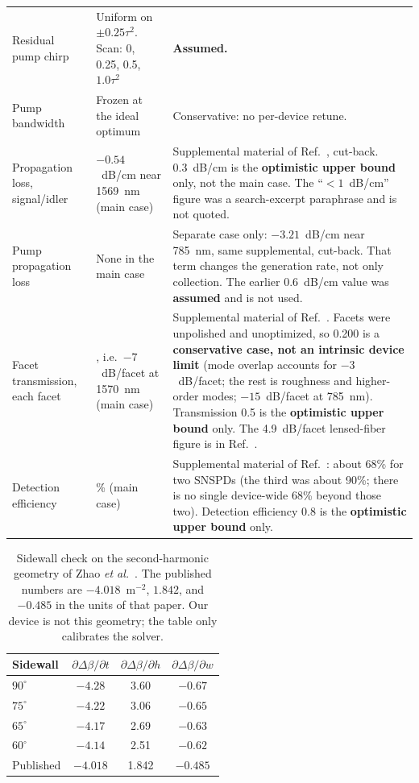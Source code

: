 \documentclass[11pt,a4paper]{article}
\begin{document}
{\begin{longtable}{@{}>{\raggedright\arraybackslash}p{2.35cm}>{\raggedright\arraybackslash}p{6.15cm}>{\raggedright\arraybackslash}p{6.55cm}@{}}
Residual pump chirp & Uniform on $\pm 0.25\tau^{2}$. Scan: 0, 0.25, 0.5, $1.0\tau^{2}$ & \textbf{Assumed.} \\
Pump bandwidth & Frozen at the ideal optimum & Conservative: no per-device retune. \\
Propagation loss, signal/idler & $-0.54$~dB/cm near 1569~nm (main case) & Supplemental material of Ref.~\cite{Zhao2020}, cut-back. 0.3~dB/cm is the \textbf{optimistic upper bound} only, not the main case. The ``$<1$~dB/cm'' figure was a search-excerpt paraphrase and is not quoted. \\
Pump propagation loss & None in the main case & Separate case only: $-3.21$~dB/cm near 785~nm, same supplemental, cut-back. That term changes the generation rate, not only collection. The earlier 0.6~dB/cm value was \textbf{assumed} and is not used. \\
Facet transmission, each facet & 0.200, i.e.\ $-7$~dB/facet at 1570~nm (main case) & Supplemental material of Ref.~\cite{Zhao2020}. Facets were unpolished and unoptimized, so 0.200 is a \textbf{conservative case, not an intrinsic device limit} (mode overlap accounts for $-3$~dB/facet; the rest is roughness and higher-order modes; $-15$~dB/facet at 785~nm). Transmission 0.5 is the \textbf{optimistic upper bound} only. The 4.9~dB/facet lensed-fiber figure is in Ref.~\cite{Shi2024}. \\
Detection efficiency & 68\% (main case) & Supplemental material of Ref.~\cite{Zhao2020}: about 68\% for two SNSPDs (the third was about 90\%; there is no single device-wide 68\% beyond those two). Detection efficiency 0.8 is the \textbf{optimistic upper bound} only. \\
\end{longtable}
}


\begin{table}[ht]
\centering
\caption{Sidewall check on the second-harmonic geometry of Zhao \emph{et al.}\ \cite{ZhaoLu2023}.
The published numbers are $-4.018$~\textmu m$^{-2}$, $1.842$, and $-0.485$ in the units of that paper.
Our device is not this geometry; the table only calibrates the solver.}
\label{tab:calib}
\begin{tabular}{lccc}
\toprule
Sidewall & $\partial\Delta\beta/\partial t$ & $\partial\Delta\beta/\partial h$ & $\partial\Delta\beta/\partial w$ \\
\midrule
$90^{\circ}$ & $-4.28$ & 3.60 & $-0.67$ \\
$75^{\circ}$ & $-4.22$ & 3.06 & $-0.65$ \\
$65^{\circ}$ & $-4.17$ & 2.69 & $-0.63$ \\
$60^{\circ}$ & $-4.14$ & 2.51 & $-0.62$ \\
Published \cite{ZhaoLu2023} & $-4.018$ & 1.842 & $-0.485$ \\
\bottomrule
\end{tabular}
\end{table}
\end{document}
